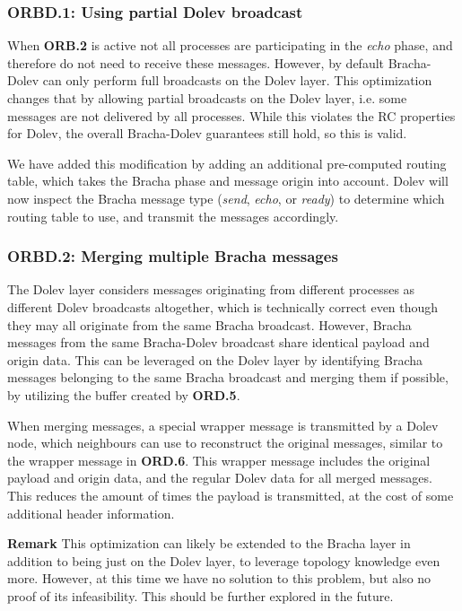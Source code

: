 \subsubsection{ORBD.1: Using partial Dolev broadcast}
When \textbf{ORB.2} is active not all processes are participating in the \textit{echo} phase, and therefore do not need to receive these messages. However, by default Bracha-Dolev can only perform full broadcasts on the Dolev layer. This optimization changes that by allowing partial broadcasts on the Dolev layer, i.e. some messages are not delivered by all processes. While this violates the RC properties for Dolev, the overall Bracha-Dolev guarantees still hold, so this is valid.

We have added this modification by adding an additional pre-computed routing table, which takes the Bracha phase and message origin into account. Dolev will now inspect the Bracha message type (\textit{send}, \textit{echo}, or \textit{ready}) to determine which routing table to use, and transmit the messages accordingly. 

\subsubsection{ORBD.2: Merging multiple Bracha messages}
The Dolev layer considers messages originating from different processes as different Dolev broadcasts altogether, which is technically correct even though they may all originate from the same Bracha broadcast. However, Bracha messages from the same Bracha-Dolev broadcast share identical payload and origin data. This can be leveraged on the Dolev layer by identifying Bracha messages belonging to the same Bracha broadcast and merging them if possible, by utilizing the buffer created by \textbf{ORD.5}.

When merging messages, a special wrapper message is transmitted by a Dolev node, which neighbours can use to reconstruct the original messages, similar to the wrapper message in \textbf{ORD.6}. This wrapper message includes the original payload and origin data, and the regular Dolev data for all merged messages. This reduces the amount of times the payload is transmitted, at the cost of some additional header information.

\textbf{Remark}
This optimization can likely be extended to the Bracha layer in addition to being just on the Dolev layer, to leverage topology knowledge even more. However, at this time we have no solution to this problem, but also no proof of its infeasibility. This should be further explored in the future.
